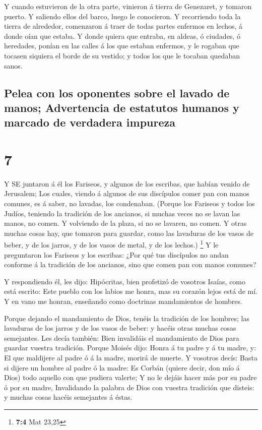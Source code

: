  Y cuando estuvieron de la otra parte, vinieron á tierra de
Genezaret, y tomaron puerto.  Y saliendo ellos del barco,
luego le conocieron.  Y recorriendo toda la tierra de
alrededor, comenzaron á traer de todas partes enfermos en lechos, á
donde oían que estaba.  Y donde quiera que entraba, en
aldeas, ó ciudades, ó heredades, ponían en las calles á los que estaban
enfermos, y le rogaban que tocasen siquiera el borde de su vestido; y
todos los que le tocaban quedaban sanos.

\hypertarget{pelea-con-los-oponentes-sobre-el-lavado-de-manos-advertencia-de-estatutos-humanos-y-marcado-de-verdadera-impureza}{%
\subsection{Pelea con los oponentes sobre el lavado de manos;
Advertencia de estatutos humanos y marcado de verdadera
impureza}\label{pelea-con-los-oponentes-sobre-el-lavado-de-manos-advertencia-de-estatutos-humanos-y-marcado-de-verdadera-impureza}}

\hypertarget{section-6}{%
\section{7}\label{section-6}}

 Y SE juntaron á él los Fariseos, y algunos de los escribas,
que habían venido de Jerusalem;  Los cuales, viendo á
algunos de sus discípulos comer pan con manos comunes, es á saber, no
lavadas, los condenaban.  (Porque los Fariseos y todos los
Judíos, teniendo la tradición de los ancianos, si muchas veces no se
lavan las manos, no comen.  Y volviendo de la plaza, si no
se lavaren, no comen. Y otras muchas cosas hay, que tomaron para
guardar, como las lavaduras de los vasos de beber, y de los jarros, y de
los vasos de metal, y de los lechos.) \footnote{\textbf{7:4} Mat 23,25}
 Y le preguntaron los Fariseos y los escribas: ¿Por qué tus
discípulos no andan conforme á la tradición de los ancianos, sino que
comen pan con manos comunes?

 Y respondiendo él, les dijo: Hipócritas, bien profetizó de
vosotros Isaías, como está escrito: Este pueblo con los labios me honra,
mas su corazón lejos está de mí.  Y en vano me honran,
enseñando como doctrinas mandamientos de hombres.

 Porque dejando el mandamiento de Dios, tenéis la tradición
de los hombres; las lavaduras de los jarros y de los vasos de beber: y
hacéis otras muchas cosas semejantes.  Les decía también:
Bien invalidáis el mandamiento de Dios para guardar vuestra tradición.
 Porque Moisés dijo: Honra á tu padre y á tu madre, y: El
que maldijere al padre ó á la madre, morirá de muerte.  Y
vosotros decís: Basta si dijere un hombre al padre ó la madre: Es Corbán
(quiere decir, don mío á Dios) todo aquello con que pudiera valerte;
 Y no le dejáis hacer más por su padre ó por su madre,
 Invalidando la palabra de Dios con vuestra tradición que
disteis: y muchas cosas hacéis semejantes á éstas.

